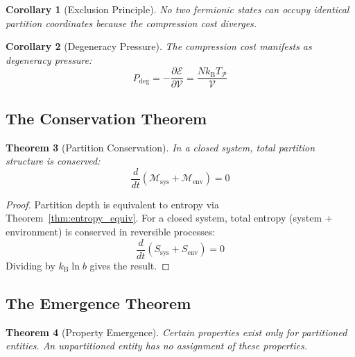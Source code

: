 \documentclass[twocolumn,10pt,a4paper]{article}
\newtheorem{theorem}{Theorem}[section]
\newtheorem{corollary}[theorem]{Corollary}
\theoremstyle{definition}
\theoremstyle{remark}
\newcommand{\kB}{k_{\mathrm{B}}}
\newcommand{\Partition}{\mathcal{P}}
\newcommand{\Depth}{\mathcal{M}}
\newcommand{\Cost}{\mathcal{E}}
\begin{document}
\begin{corollary}[Exclusion Principle]
\label{cor:exclusion}
No two fermionic states can occupy identical partition coordinates because the compression cost diverges.
\end{corollary}

\begin{corollary}[Degeneracy Pressure]
\label{cor:degeneracy}
The compression cost manifests as degeneracy pressure:
\begin{equation}
    P_{\text{deg}} = -\frac{\partial \Cost}{\partial \mathcal{V}} = \frac{N\kB T_{\Partition}}{\mathcal{V}}
\end{equation}
\end{corollary}

\subsection{The Conservation Theorem}

\begin{theorem}[Partition Conservation]
\label{thm:conservation}
In a closed system, total partition structure is conserved:
\begin{equation}
    \frac{d}{dt}\left(\Depth_{\text{sys}} + \Depth_{\text{env}}\right) = 0
\end{equation}
\end{theorem}

\begin{proof}
Partition depth is equivalent to entropy via Theorem~\ref{thm:entropy_equiv}. For a closed system, total entropy (system + environment) is conserved in reversible processes:
\begin{equation}
    \frac{d}{dt}(S_{\text{sys}} + S_{\text{env}}) = 0
\end{equation}
Dividing by $\kB \ln b$ gives the result.
\end{proof}

\subsection{The Emergence Theorem}

\begin{theorem}[Property Emergence]
\label{thm:emergence}
Certain properties exist only for partitioned entities. An unpartitioned entity has no assignment of these properties.
\end{theorem}
\end{document}
